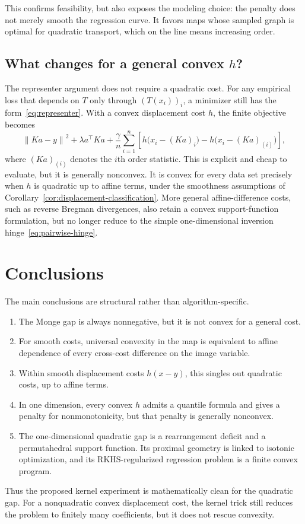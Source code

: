 \documentclass[11pt,a4paper]{article}
\theoremstyle{definition}
\theoremstyle{remark}
\newcommand{\norm}[1]{\left\lVert #1\right\rVert}
\begin{document}
This confirms feasibility, but also exposes the modeling choice: the penalty
does not merely smooth the regression curve. It favors maps whose sampled
graph is optimal for quadratic transport, which on the line means increasing
order.

\subsection{What changes for a general convex \texorpdfstring{$h$}{h}?}

The representer argument does not require a quadratic cost. For any empirical
loss that depends on $T$ only through $(T(x_i))_i$, a minimizer still has the
form~\eqref{eq:representer}. With a convex displacement cost $h$, the finite
objective becomes
\begin{equation}\label{eq:kernel-general-h}
  \norm{Ka-y}^2+\lambda a^\top Ka
  +\frac\gamma n\sum_{i=1}^n
  \left[
    h\bigl(x_i-(Ka)_i\bigr)
    -h\bigl(x_i-(Ka)_{(i)}\bigr)
  \right],
\end{equation}
where $(Ka)_{(i)}$ denotes the $i$th order statistic. This is explicit and
cheap to evaluate, but it is generally nonconvex. It is convex for every data
set precisely when $h$ is quadratic up to affine terms, under the smoothness
assumptions of Corollary~\ref{cor:displacement-classification}. More general
affine-difference costs, such as reverse Bregman divergences, also retain a
convex support-function formulation, but no longer reduce to the simple
one-dimensional inversion hinge~\eqref{eq:pairwise-hinge}.

\section{Conclusions}

The main conclusions are structural rather than algorithm-specific.
\begin{enumerate}
  \item The Monge gap is always nonnegative, but it is not convex for a
    general cost.
  \item For smooth costs, universal convexity in the map is equivalent to
    affine dependence of every cross-cost difference on the image variable.
  \item Within smooth displacement costs $h(x-y)$, this singles out quadratic
    costs, up to affine terms.
  \item In one dimension, every convex $h$ admits a quantile formula and gives
    a penalty for nonmonotonicity, but that penalty is generally nonconvex.
  \item The one-dimensional quadratic gap is a rearrangement deficit and a
    permutahedral support function. Its proximal geometry is linked to
    isotonic optimization, and its RKHS-regularized regression problem is a
    finite convex program.
\end{enumerate}

Thus the proposed kernel experiment is mathematically clean for the quadratic
gap. For a nonquadratic convex displacement cost, the kernel trick still
reduces the problem to finitely many coefficients, but it does not rescue
convexity.



\end{document}
